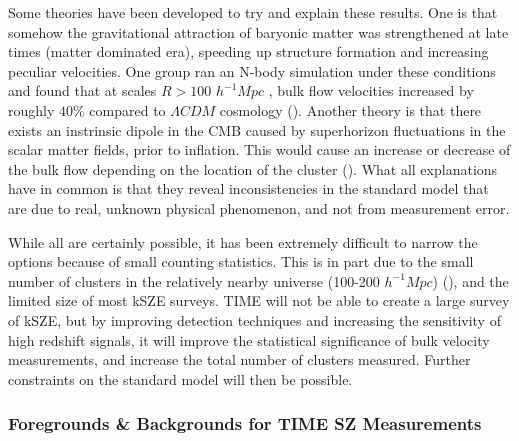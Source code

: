 \documentclass[manuscript]{aastex}
\begin{document}
Some theories have been developed to try and explain these results. One is that somehow the gravitational attraction of baryonic matter was strengthened at late times (matter dominated era), speeding up structure formation and increasing peculiar velocities. One group ran an N-body simulation under these conditions and found that at scales  \(R > 100\) \(h^{-1} Mpc\) , bulk flow velocities increased by roughly \(40\%\) compared to \(\Lambda CDM\) cosmology (\cite{Wyman2010}). Another theory is that there exists an instrinsic dipole in the CMB caused by superhorizon fluctuations in the scalar matter fields, prior to inflation. This would cause an increase or decrease of the bulk flow depending on the location of the cluster (\cite{Mak2011}).  What all explanations have in common is that they reveal inconsistencies in the standard model that are due to real, unknown physical phenomenon, and not from measurement error. 

While all are certainly possible, it has been extremely difficult to narrow the options because of small counting statistics. This is in part due to the small number of clusters in the relatively nearby universe (100-200 \(h^{-1} Mpc\)) (\cite{Lavaux2013}), and the limited size of most kSZE surveys. TIME will not be able to create a large survey of kSZE, but by improving detection techniques and increasing the sensitivity of high redshift signals, it will improve the statistical significance of bulk velocity measurements, and increase the total number of clusters measured. Further constraints on the standard model will then be possible.  

\subsubsection{\textbf{Foregrounds \& Backgrounds for TIME SZ Measurements}}
\end{document}
